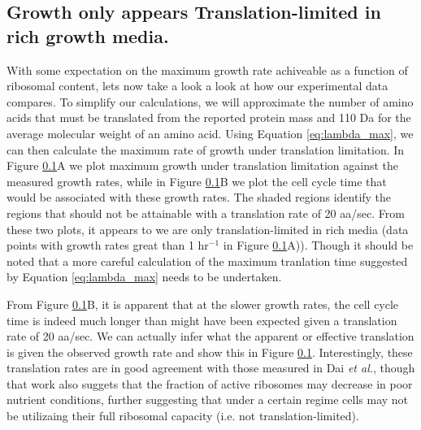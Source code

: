 \documentclass[11pt, letterpaper]{article}
\begin{document}
\subsection{Growth only appears Translation-limited in rich growth media.}


With some expectation on the maximum growth rate achiveable as a function of
ribosomal content, lets now take a look a look at how our experimental data
compares. To simplify our calculations, we will approximate the number of amino
acids that must be translated from the reported protein mass and 110 Da for the
average molecular weight of an amino acid. Using Equation \ref{eq:lambda_max},
we can then calculate the maximum rate of growth under translation limitation.
In Figure \ref{}A we plot maximum growth under translation limitation against
the measured growth rates, while in Figure \ref{}B we plot the cell cycle time
that would be associated with these growth rates. The shaded regions identify
the regions that should not be attainable with a translation rate of 20 aa/sec.
From these two plots, it appears to we are only translation-limited
in rich media (data points with growth rates great than 1 hr$^{-1}$ in Figure \ref{}A)).
Though it should be noted that a more careful  calculation of the maximum
tranlation time suggested by Equation \ref{eq:lambda_max} needs to be
undertaken.


From Figure \ref{}B, it is apparent that at the slower growth rates, the cell
cycle  time is indeed much longer than might have been expected given a
translation rate of 20 aa/sec. We can actually infer what the apparent or
effective translation is given the observed growth rate and show this in Figure
\ref{}.  Interestingly, these translation rates are in good agreement with those
measured in Dai {\it et al.}, though that work also suggets that the fraction of
active ribosomes may decrease in poor nutrient conditions, further suggesting
that under a certain regime cells may not be utilizaing their full ribosomal
capacity (i.e. not translation-limited).
\end{document}
